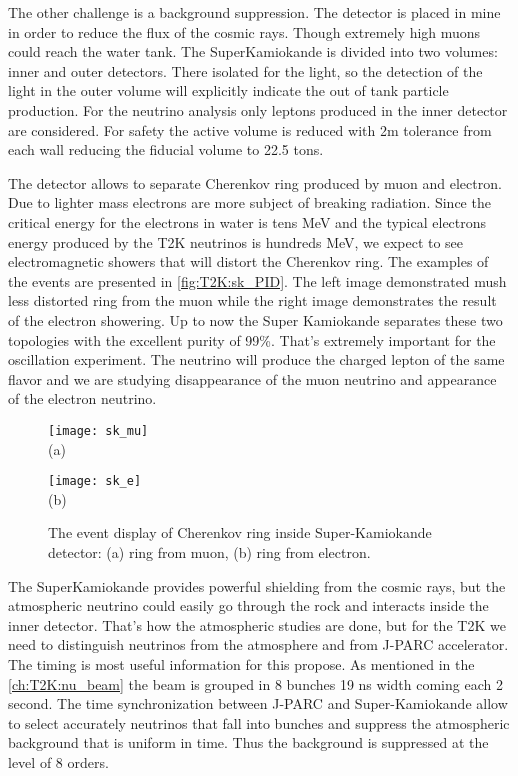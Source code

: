 \documentclass[../main.tex]{subfiles}
\begin{document}
The other challenge is a background suppression. The detector is placed in mine in order to reduce the flux of the cosmic rays. Though extremely high muons could reach the water tank. The SuperKamiokande is divided into two volumes: inner and outer detectors. There isolated for the light, so the detection of the light in the outer volume will explicitly indicate the out of tank particle production. For the neutrino analysis only leptons produced in the inner detector are considered. For safety the active volume is reduced with 2m tolerance from each wall reducing the fiducial volume to 22.5 tons.

The detector allows to separate Cherenkov ring produced by muon and electron. Due to lighter mass electrons are more subject of breaking radiation. Since the critical energy for the electrons in water is tens MeV and the typical electrons energy produced by the T2K neutrinos is hundreds MeV, we expect to see electromagnetic showers that will distort the Cherenkov ring. The examples of the events are presented in \autoref{fig:T2K:sk_PID}. The left image demonstrated mush less distorted ring from the muon while the right image demonstrates the result of the electron showering. Up to now the Super Kamiokande separates these two topologies with the excellent purity of 99\%. That's extremely important for the oscillation experiment. The neutrino will produce the charged lepton of the same flavor and we are studying disappearance of the muon neutrino and appearance of the electron neutrino.

\begin{figure}[h!]
  \centering
  \begin{minipage}{0.49\linewidth}
    \centering
    \texttt{[image: sk\_mu]} \\ (a)
  \end{minipage}
  \begin{minipage}{0.49\linewidth}
    \centering
    \texttt{[image: sk\_e]} \\ (b)
  \end{minipage}
    \caption{The event display of Cherenkov ring inside Super-Kamiokande detector: (a) ring from muon, (b) ring from electron.}
    \label{fig:T2K:sk_PID}
\end{figure}

The SuperKamiokande provides powerful shielding from the cosmic rays, but the atmospheric neutrino could easily go through the rock and interacts inside the inner detector. That's how the atmospheric studies are done, but for the T2K we need to distinguish neutrinos from the atmosphere and from J-PARC accelerator. The timing is most useful information for this propose. As mentioned in the \autoref{ch:T2K:nu_beam} the beam is grouped in 8 bunches 19 ns width coming each 2 second. The time synchronization between J-PARC and Super-Kamiokande allow to select accurately neutrinos that fall into bunches and suppress the atmospheric background that is uniform in time. Thus the background is suppressed at the level of 8 orders.
\end{document}
